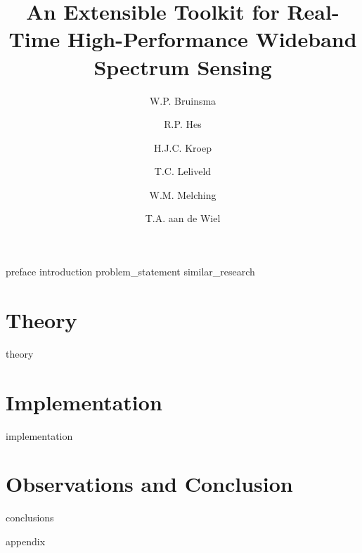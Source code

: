 \documentclass[a4paper, openany, oneside]{memoir}
\title{An Extensible Toolkit for Real-Time High-Performance Wideband Spectrum Sensing}
\author{W.P. Bruinsma \and R.P. Hes \and H.J.C. Kroep \and T.C. Leliveld \and W.M. Melching \and T.A. aan de Wiel}
\begin{document}
\frontmatter

\begin{titlingpage}
  \pagestyle{empty}
  \maketitle
\end{titlingpage}


\tableofcontents

\mainmatter
{preface}
{introduction}
{problem_statement}
{similar_research}
\part{Theory}
\label{prt:theory}
{theory}
\part{Implementation}
\label{prt:implementation}
{implementation}


\part{Observations and Conclusion}
{conclusions}

\clearpage

\printbibliography

\clearpage
{}
{appendix}
\end{document}
